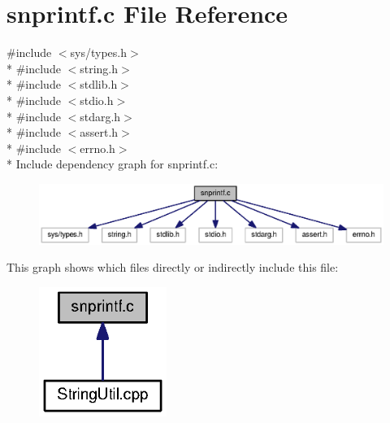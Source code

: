 \section{snprintf.\-c File Reference}
\label{snprintf_8c}
{\ttfamily \#include $<$sys/types.\-h$>$}\\*
{\ttfamily \#include $<$string.\-h$>$}\\*
{\ttfamily \#include $<$stdlib.\-h$>$}\\*
{\ttfamily \#include $<$stdio.\-h$>$}\\*
{\ttfamily \#include $<$stdarg.\-h$>$}\\*
{\ttfamily \#include $<$assert.\-h$>$}\\*
{\ttfamily \#include $<$errno.\-h$>$}\\*
Include dependency graph for snprintf.\-c\-:
\nopagebreak
\begin{figure}[H]
\begin{center}
\leavevmode
\includegraphics[width=350pt]{dc/dc8/snprintf_8c__incl}
\end{center}
\end{figure}
This graph shows which files directly or indirectly include this file\-:
\nopagebreak
\begin{figure}[H]
\begin{center}
\leavevmode
\includegraphics[width=118pt]{de/d0e/snprintf_8c__dep__incl}
\end{center}
\end{figure}
